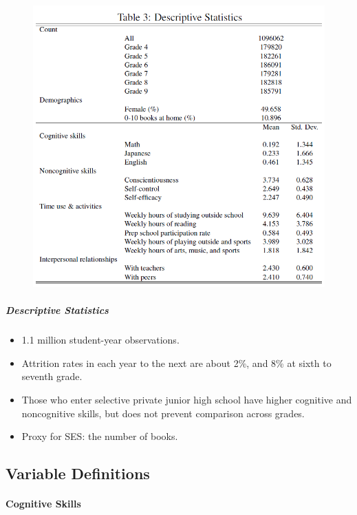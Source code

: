 \documentclass[../root]{subfiles}
\begin{document}
    \begin{figure}[ht]
      \centering
      \includegraphics[scale = 1]{0904tanji/T3}
    \end{figure}

    \subparagraph{Descriptive Statistics}

    \begin{itemize}
      \item 1.1 million student-year observations.
      \item Attrition rates in each year to the next are about 2\%, and 8\% at sixth to seventh grade.
      \item Those who enter selective private junior high school have higher cognitive and noncognitive skills, but does not prevent comparison across grades.
      \item Proxy for SES: the number of books.
    \end{itemize}

    \subsection{Variable Definitions}

    \paragraph{Cognitive Skills}
\end{document}
